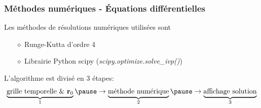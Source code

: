 \begin{frame}
    \frametitle{Méthodes numériques - Équations différentielles}
    Les méthodes de résolutions numériques utilisées sont
    \vspace{0.5cm}
    \begin{itemize}
        \setlength\itemsep{1em}
        \item[$\diamond$] Runge-Kutta d'ordre 4
        \item[$\diamond$] Librairie Python scipy (\textit{scipy.optimize.solve\_ivp()})
    \end{itemize}
    \vspace{1cm}\pause
    L'algorithme est divisé en 3 étapes: \pause
    $$
        \underbrace{\text{grille temporelle \& } \bm{r}_0}_1 \pause \to \underbrace{\text{méthode numérique}}_2 \pause \to \underbrace{\text{affichage solution}}_3
    $$
\end{frame}

\begin{frame}
    \begin{center}
    \vspace{0.5cm}
    \end{center}
\end{frame}

